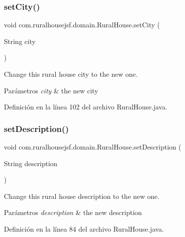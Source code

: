 \subsubsection{\texorpdfstring{setCity()}{setCity()}}
{\footnotesize\ttfamily void com.\+ruralhousejsf.\+domain.\+Rural\+House.\+set\+City (\begin{DoxyParamCaption}\item[{String}]{city }\end{DoxyParamCaption})}



Change this rural house city to the new one. 


\begin{DoxyParams}{Parámetros}
{\em city} & the new city \\
\hline
\end{DoxyParams}


Definición en la línea 102 del archivo Rural\+House.\+java.

\mbox{\label{a00188_ad4e39275d6996833e089c2013bfb9c4b}} 
\subsubsection{\texorpdfstring{setDescription()}{setDescription()}}
{\footnotesize\ttfamily void com.\+ruralhousejsf.\+domain.\+Rural\+House.\+set\+Description (\begin{DoxyParamCaption}\item[{String}]{description }\end{DoxyParamCaption})}



Change this rural house description to the new one. 


\begin{DoxyParams}{Parámetros}
{\em description} & the new description \\
\hline
\end{DoxyParams}


Definición en la línea 84 del archivo Rural\+House.\+java.

\mbox{\label{a00188_aaea8ea8cb5cb886fb0b7e38bb7546472}} 
